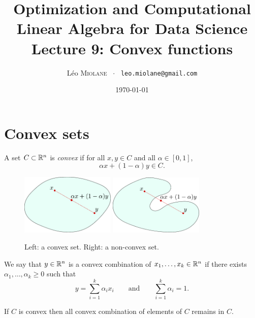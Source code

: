 \documentclass[11pt,nocut]{article}
\title{\vspace{-2.0cm}%
	Optimization and Computational Linear Algebra for Data Science\\
Lecture 9: Convex functions}
\author{Léo \textsc{Miolane} \ $\cdot$ \ \texttt{leo.miolane@gmail.com}}
\date{\today}
\begin{document}
\maketitle


\section{Convex sets}

\begin{definition}
	A set $C \subset \mathbb{R}^n$ is \emph{convex} if for all $x,y \in C$ and all $\alpha \in [0,1]$,
	$$
	\alpha x + (1-\alpha) y \in C.
	$$
\end{definition}

\begin{figure}[h!]
	\begin{center}
	\includegraphics[width=0.4\textwidth]{figures/convex.pdf}
	\hspace{0.9cm}
	\includegraphics[width=0.4\textwidth]{figures/non_convex.pdf}
	\end{center}
	\caption{Left: a convex set. Right: a non-convex set.}
\end{figure}
\begin{definition}
	We say that $y \in \mathbb{R}^n$ is a convex combination of $x_1, \dots, x_k \in \mathbb{R}^n$ if there exists $\alpha_1, \dots, \alpha_k \geq 0$ such that
	$$
	y = \sum_{i=1}^k \alpha_i x_i \qquad \text{and} \qquad \sum_{i=1}^k \alpha_i = 1.
	$$
\end{definition}

\begin{proposition}
	If $C$ is convex then all convex combination of elements of $C$ remains in $C$.
\end{proposition}
\end{document}
